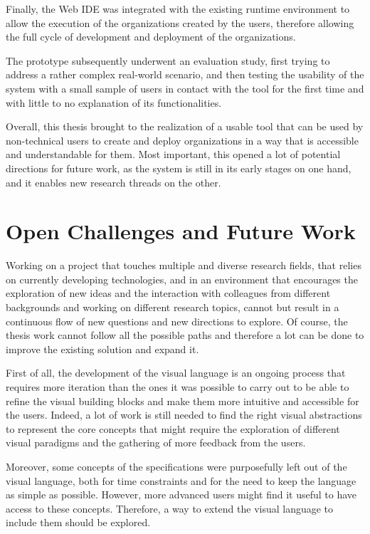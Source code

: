 Finally, the Web IDE was integrated with the existing runtime environment to allow the execution of the organizations created by the users, therefore allowing the full cycle of development and deployment of the organizations.

The prototype subsequently underwent an evaluation study, first trying to address a rather complex real-world scenario, and then testing the usability of the system with a small sample of users in contact with the tool for the first time and with little to no explanation of its functionalities.

Overall, this thesis brought to the realization of a usable tool that can be used by non-technical users to create and deploy organizations in a way that is accessible and understandable for them.
Most important, this opened a lot of potential directions for future work, as the system is still in its early stages on one hand, and it enables new research threads on the other.

\section*{Open Challenges and Future Work}
Working on a project that touches multiple and diverse research fields, that relies on currently developing technologies, and in an environment that encourages the exploration of new ideas and the interaction with colleagues from different backgrounds and working on different research topics, cannot but result in a continuous flow of new questions and new directions to explore.
Of course, the thesis work cannot follow all the possible paths and therefore a lot can be done to improve the existing solution and expand it.

First of all, the development of the visual language is an ongoing process that requires more iteration than the ones it was possible to carry out to be able to refine the visual building blocks and make them more intuitive and accessible for the users.
Indeed, a lot of work is still needed to find the right visual abstractions to represent the core concepts that might require the exploration of different visual paradigms and the gathering of more feedback from the users.

Moreover, some concepts of the \moise{} specifications were purposefully left out of the visual language, both for time constraints and for the need to keep the language as simple as possible.
However, more advanced users might find it useful to have access to these concepts.
Therefore, a way to extend the visual language to include them should be explored.

